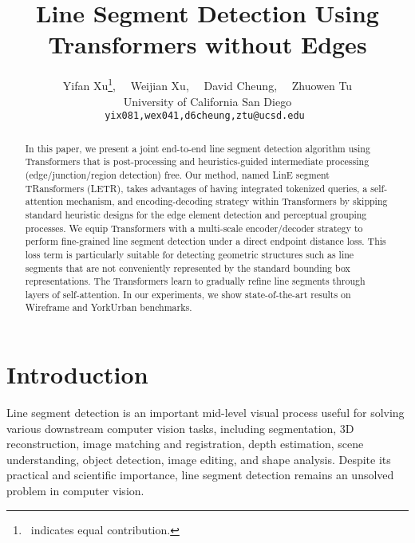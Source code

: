 \documentclass[final]{cvpr}
\newcommand*\samethanks[1][\value{footnote}]{\footnotemark[#1]}
\begin{document}
\title{Line Segment Detection Using Transformers without Edges}

\author{Yifan Xu\thanks{~indicates equal contribution.}, ~~Weijian Xu\samethanks, ~~David Cheung, ~~Zhuowen Tu \\
University of California San Diego \\
{\tt\small yix081,wex041,d6cheung,ztu@ucsd.edu }
}

\maketitle



\begin{abstract}
In this paper, we present a joint end-to-end line segment detection algorithm using Transformers that is post-processing and heuristics-guided intermediate processing (edge/junction/region detection) free. Our method, named LinE segment TRansformers (LETR), takes advantages of having integrated tokenized queries, a self-attention mechanism, and encoding-decoding strategy within Transformers by skipping standard heuristic designs for the edge element detection and perceptual grouping processes. We equip Transformers with a multi-scale encoder/decoder strategy to perform fine-grained line segment detection under a direct endpoint distance loss. This loss term is particularly suitable for detecting geometric structures such as line segments that are not conveniently represented by the standard bounding box representations. The Transformers learn to gradually refine line segments through layers of self-attention. In our experiments, we show state-of-the-art results on Wireframe and YorkUrban benchmarks. 
\let\thefootnote\relax{}

\end{abstract}

\section{Introduction}

Line segment detection is an important mid-level visual process \cite{marr1982vision} useful for solving various downstream computer vision tasks, including segmentation, 3D reconstruction, image matching and registration, depth estimation, scene understanding, object detection, image editing, and shape analysis. Despite its practical and scientific importance, line segment detection remains an unsolved problem in computer vision.
\end{document}

